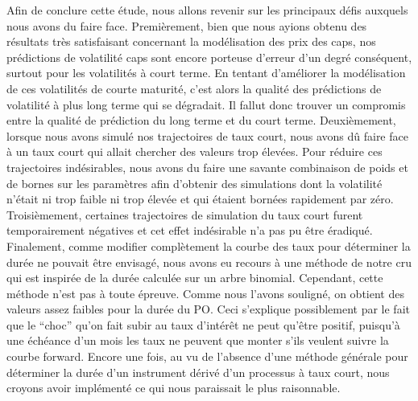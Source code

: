 Afin de conclure cette étude, nous allons revenir sur les principaux défis auxquels nous
avons du faire face. Premièrement, bien que nous ayions obtenu des résultats très
satisfaisant concernant la modélisation des prix des caps, nos prédictions de volatilité
caps sont encore porteuse d'erreur d'un degré conséquent, surtout pour les volatilités à
court terme. En tentant d'améliorer la modélisation de ces volatilités de courte maturité,
c'est alors la qualité des prédictions de volatilité à plus long terme qui se
dégradait. Il fallut donc trouver un compromis entre la qualité de prédiction du long
terme et du court terme.  Deuxièmement, lorsque nous avons simulé nos trajectoires de taux
court, nous avons dû faire face à un taux court qui allait chercher des valeurs trop
élevées. Pour réduire ces trajectoires indésirables, nous avons du faire une savante
combinaison de poids et de bornes sur les paramètres afin d'obtenir des simulations dont
la volatilité n'était ni trop faible ni trop élevée et qui étaient bornées rapidement par
zéro. Troisièmement, certaines trajectoires de simulation du taux court furent
temporairement négatives et cet effet indésirable n'a pas pu être éradiqué.  Finalement,
comme modifier complètement la courbe des taux pour déterminer la durée ne pouvait être
envisagé, nous avons eu recours à une méthode de notre cru qui est inspirée de la durée
calculée sur un arbre binomial. Cependant, cette méthode n'est pas à toute épreuve. Comme
nous l'avons souligné, on obtient des valeurs assez faibles pour la durée du PO. Ceci
s'explique possiblement par le fait que le ``choc'' qu'on fait subir au taux d'intérêt ne
peut qu'être positif, puisqu'à une échéance d'un mois les taux ne peuvent que monter s'ils
veulent suivre la courbe forward. Encore une fois, au vu de l'absence d'une méthode
générale pour déterminer la durée d'un instrument dérivé d'un processus à taux court, nous
croyons avoir implémenté ce qui nous paraissait le plus raisonnable.

